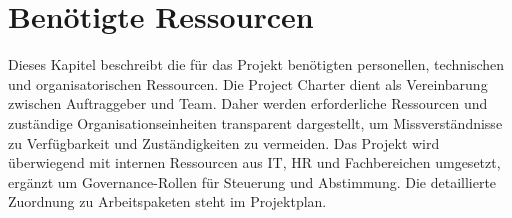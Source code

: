 
\chapter{Benötigte Ressourcen}

Dieses Kapitel beschreibt die für das Projekt benötigten personellen,
technischen und organisatorischen Ressourcen. Die Project Charter dient als
Vereinbarung zwischen Auftraggeber und Team. Daher werden erforderliche
Ressourcen und zuständige Organisationseinheiten transparent dargestellt, um
Missverständnisse zu Verfügbarkeit und Zuständigkeiten zu vermeiden. Das
Projekt wird überwiegend mit internen Ressourcen aus \ac{IT}, \ac{HR} und
Fachbereichen umgesetzt, ergänzt um Governance-Rollen für Steuerung und
Abstimmung. Die detaillierte Zuordnung zu Arbeitspaketen steht im Projektplan.

